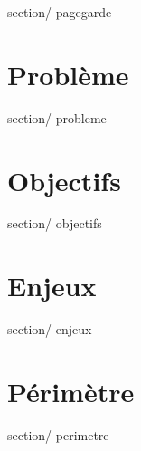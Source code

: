 \documentclass[french, 11pt, a4paper]{article}
\begin{document}
\thispagestyle {plain}

 {section/} {pagegarde}
\newpage

\section {Problème}
 {section/} {probleme}

\section {Objectifs}
 {section/} {objectifs}


\section {Enjeux}
 {section/} {enjeux}


\section {Périmètre}
 {section/} {perimetre}
\end{document}
